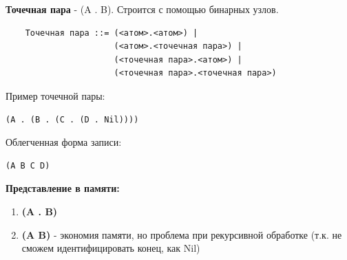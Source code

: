 \textbf{Точечная пара} - (A . B). Строится с помощью бинарных узлов.   

\begin{lstlisting}
	Точечная пара ::= (<атом>.<атом>) |
					  (<атом>.<точечная пара>) |
					  (<точечная пара>.<атом>) |
					  (<точечная пара>.<точечная пара>)	
\end{lstlisting}

Пример точечной пары:
\begin{lstlisting}
(A . (B . (C . (D . Nil))))
\end{lstlisting}
Облегченная форма записи:
\begin{lstlisting}
(A B C D)
\end{lstlisting}

\begin{figure}[ht!]
\end{figure}

\textbf{Представление в памяти:}

\begin{enumerate}
	\item \textbf{(A . B)}
	\begin{figure}[ht!]
	\end{figure}
	\item \textbf{(A B)} - экономия памяти, но проблема при рекурсивной обработке (т.к. не сможем идентифицировать конец, как Nil)
	\begin{figure}[ht!]
	\end{figure}
\end{enumerate}

